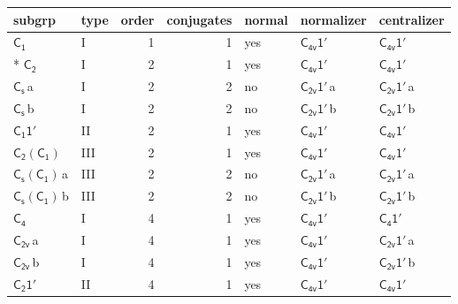 \documentclass[10pt,a4paper]{article}
\numberwithin{equation}{section}
\newcommand{\grp}[1]{\mathsf{#1}}
\newcommand{\clsletter}[1]{\,{\scriptsize\color{black!55}#1}}
\begin{document}
{\small\begin{longtable}{@{}llrrlll@{}}\toprule
subgrp & type & order & conjugates & normal & normalizer & centralizer\\\midrule\endhead
\bottomrule\endfoot\endlastfoot
\href{../../../rotation/data/pdf/C1.pdf}{$\grp{C_{1}}$} & I & 1 & 1 & yes & \href{C4v-1p.pdf}{$\grp{C_{4v}1'}$} & \href{C4v-1p.pdf}{$\grp{C_{4v}1'}$}\\*
\href{../../../rotation/data/pdf/C2.pdf}{$\grp{C_{2}}$} & I & 2 & 1 & yes & \href{C4v-1p.pdf}{$\grp{C_{4v}1'}$} & \href{C4v-1p.pdf}{$\grp{C_{4v}1'}$}\\
\href{../../../rotation/data/pdf/C1v.pdf}{$\grp{C_{s}}$}\clsletter{a} & I & 2 & 2 & no & \href{C2v-1p.pdf}{$\grp{C_{2v}1'}$}\clsletter{a} & \href{C2v-1p.pdf}{$\grp{C_{2v}1'}$}\clsletter{a}\\
\href{../../../rotation/data/pdf/C1v.pdf}{$\grp{C_{s}}$}\clsletter{b} & I & 2 & 2 & no & \href{C2v-1p.pdf}{$\grp{C_{2v}1'}$}\clsletter{b} & \href{C2v-1p.pdf}{$\grp{C_{2v}1'}$}\clsletter{b}\\
\href{C1-1p.pdf}{$\grp{C_{1}1'}$} & II & 2 & 1 & yes & \href{C4v-1p.pdf}{$\grp{C_{4v}1'}$} & \href{C4v-1p.pdf}{$\grp{C_{4v}1'}$}\\
\href{C2-C1.pdf}{$\grp{C_{2}}(\grp{C_{1}})$} & III & 2 & 1 & yes & \href{C4v-1p.pdf}{$\grp{C_{4v}1'}$} & \href{C4v-1p.pdf}{$\grp{C_{4v}1'}$}\\
\href{C1v-C1.pdf}{$\grp{C_{s}}(\grp{C_{1}})$}\clsletter{a} & III & 2 & 2 & no & \href{C2v-1p.pdf}{$\grp{C_{2v}1'}$}\clsletter{a} & \href{C2v-1p.pdf}{$\grp{C_{2v}1'}$}\clsletter{a}\\
\href{C1v-C1.pdf}{$\grp{C_{s}}(\grp{C_{1}})$}\clsletter{b} & III & 2 & 2 & no & \href{C2v-1p.pdf}{$\grp{C_{2v}1'}$}\clsletter{b} & \href{C2v-1p.pdf}{$\grp{C_{2v}1'}$}\clsletter{b}\\
\href{../../../rotation/data/pdf/C4.pdf}{$\grp{C_{4}}$} & I & 4 & 1 & yes & \href{C4v-1p.pdf}{$\grp{C_{4v}1'}$} & \href{C4-1p.pdf}{$\grp{C_{4}1'}$}\\
\href{../../../rotation/data/pdf/C2v.pdf}{$\grp{C_{2v}}$}\clsletter{a} & I & 4 & 1 & yes & \href{C4v-1p.pdf}{$\grp{C_{4v}1'}$} & \href{C2v-1p.pdf}{$\grp{C_{2v}1'}$}\clsletter{a}\\
\href{../../../rotation/data/pdf/C2v.pdf}{$\grp{C_{2v}}$}\clsletter{b} & I & 4 & 1 & yes & \href{C4v-1p.pdf}{$\grp{C_{4v}1'}$} & \href{C2v-1p.pdf}{$\grp{C_{2v}1'}$}\clsletter{b}\\
\href{C2-1p.pdf}{$\grp{C_{2}1'}$} & II & 4 & 1 & yes & \href{C4v-1p.pdf}{$\grp{C_{4v}1'}$} & \href{C4v-1p.pdf}{$\grp{C_{4v}1'}$}\\

\end{longtable}}
\end{document}
